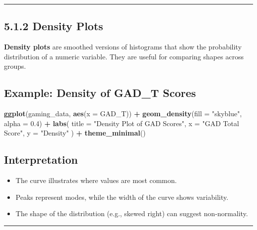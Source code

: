\documentclass[
]{book}
\newenvironment{Shaded}{\begin{snugshade}}{\end{snugshade}}
\newcommand{\AttributeTok}[1]{\textcolor[rgb]{0.13,0.29,0.53}{#1}}
\newcommand{\FloatTok}[1]{\textcolor[rgb]{0.00,0.00,0.81}{#1}}
\newcommand{\FunctionTok}[1]{\textcolor[rgb]{0.13,0.29,0.53}{\textbf{#1}}}
\newcommand{\NormalTok}[1]{#1}
\newcommand{\SpecialCharTok}[1]{\textcolor[rgb]{0.81,0.36,0.00}{\textbf{#1}}}
\newcommand{\StringTok}[1]{\textcolor[rgb]{0.31,0.60,0.02}{#1}}
\providecommand{\tightlist}{%
  \setlength{\itemsep}{0pt}\setlength{\parskip}{0pt}}
\begin{document}
\begin{center}\rule{0.5\linewidth}{0.5pt}\end{center}

\subsection{5.1.2 Density Plots}\label{density-plots}

\textbf{Density plots} are smoothed versions of histograms that show the probability distribution of a numeric variable. They are useful for comparing shapes across groups.

\subsection{Example: Density of GAD\_T Scores}\label{example-density-of-gad_t-scores}

\begin{Shaded}
\begin{Highlighting}[]
\FunctionTok{ggplot}\NormalTok{(gaming\_data, }\FunctionTok{aes}\NormalTok{(}\AttributeTok{x =}\NormalTok{ GAD\_T)) }\SpecialCharTok{+}
  \FunctionTok{geom\_density}\NormalTok{(}\AttributeTok{fill =} \StringTok{"skyblue"}\NormalTok{, }\AttributeTok{alpha =} \FloatTok{0.4}\NormalTok{) }\SpecialCharTok{+}
  \FunctionTok{labs}\NormalTok{(}
    \AttributeTok{title =} \StringTok{"Density Plot of GAD Scores"}\NormalTok{,}
    \AttributeTok{x =} \StringTok{"GAD Total Score"}\NormalTok{,}
    \AttributeTok{y =} \StringTok{"Density"}
\NormalTok{  ) }\SpecialCharTok{+}
  \FunctionTok{theme\_minimal}\NormalTok{()}
\end{Highlighting}
\end{Shaded}

\subsection{Interpretation}\label{interpretation-8}

\begin{itemize}
\tightlist
\item
  The curve illustrates where values are most common.
\item
  Peaks represent modes, while the width of the curve shows variability.
\item
  The shape of the distribution (e.g., skewed right) can suggest non-normality.
\end{itemize}

\begin{center}\rule{0.5\linewidth}{0.5pt}\end{center}
\end{document}
